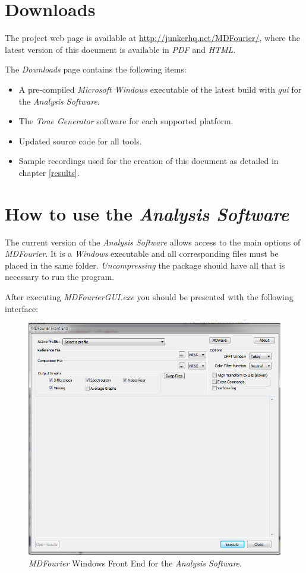 \documentclass[10pt,a4paper]{report}
\newcommand{\ac}[1]{\textit{\mbox{\acrshort{#1}}}}
\begin{document}
\begin{appendices}
	
\chapter{Downloads}
\label{downloads}

The project web page is available at \url{http://junkerhq.net/MDFourier/}, where the latest version of this document is available in \textit{PDF} and \textit{HTML}.

The \textit{Downloads} page contains the following items:
\begin{itemize}
	\item A pre-compiled \textit{Microsoft Windows} executable of the latest build with \ac{gui} for the \textit{Analysis Software}.
	\item The \textit{Tone Generator} software for each supported platform.
	\item Updated source code for all tools.
	\item Sample recordings used for the creation of this document as detailed in chapter \ref{results}.
\end{itemize}
	
\chapter{How to use the \textit{Analysis Software}}
\label{usinggui}
The current version of the \textit{Analysis Software} allows access to the main options of \textit{MDFourier}. It is a \textit{Windows} executable and all corresponding files must be placed in the same folder. \textit{Uncompressing} the package should have all that is necessary to run the program.

After executing \textit{MDFourierGUI.exe} you should be presented with the following interface:

\begin{figure}[H]
	\centering
	\includegraphics[width=0.55\linewidth]{images/GUI/GUI1.png}
	\caption[Front End]{\textit{MDFourier} Windows Front End for the \textit{Analysis Software}.}
	\label{fig:gui1}
\end{figure}


\end{appendices}
\end{document}
